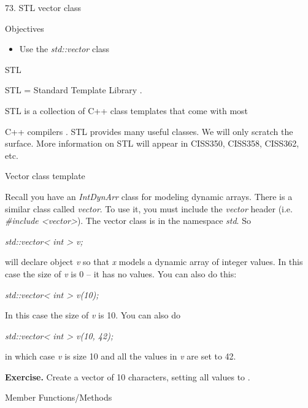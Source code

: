 \documentclass[
]{article}
\author{}
\date{}
\providecommand{\tightlist}{%
  \setlength{\itemsep}{0pt}\setlength{\parskip}{0pt}}
\begin{document}
73. STL vector class

Objectives

\begin{itemize}
\tightlist
\item
  Use the \emph{std::vector} class
\end{itemize}

STL

STL = Standard Template Library .

STL is a collection of C++ class templates that come with most

C++ compilers . STL provides many useful classes. We will only scratch
the surface. More information on STL will appear in CISS350, CISS358,
CISS362, etc.

Vector class template

Recall you have an \emph{IntDynArr} class for modeling dynamic arrays.
There is a similar class called \emph{vector}. To use it, you must
include the \emph{vector} header (i.e. \emph{\#include
\textless vector\textgreater{}}). The vector class is in the namespace
\emph{std}. So

\emph{ std::vector\textless{} int \textgreater{} v;}

will declare object \emph{v} so that \emph{x} models a dynamic array of
integer values. In this case the size of \emph{v} is 0 -- it has no
values. You can also do this:

\emph{ std::vector\textless{} int \textgreater{} v(10);}

In this case the size of \emph{v} is 10. You can also do

\emph{ std::vector\textless{} int \textgreater{} v(10, 42);}

in which case \emph{v} is size 10 and all the values in \emph{v} are set
to 42.

\textbf{Exercise. }Create a vector of 10 characters, setting all values
to \emph{\textquotesingle{} \textquotesingle{}}.

Member Functions/Methods
\end{document}
